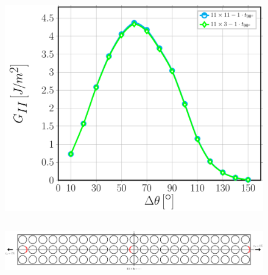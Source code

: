 \documentclass[first,firstsupp,lastsupp,last,hyperref,table]{ETHclass}
\begin{document}
\begin{frame}
\begin{columns}[c]
\begin{column}{0.5\textwidth}
\begin{figure}
\includegraphics[width=\columnwidth]{nxk-1-vf60-GII-thin.pdf}
\end{figure}
\end{column}
\end{columns}
\begin{figure}
\centering
\includegraphics[width=\textwidth]{twofibers-sameside-crackshielding11.pdf}
\end{figure}
\end{frame}

\addtocounter{framenumber}{-1}
\end{document}
